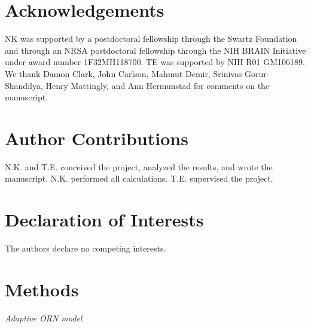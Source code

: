 \documentclass[10pt,prl,aps,showpacs,twocolumn,unsortedaddress,showkeys,linenumbers]{revtex4-1}
\begin{document}



\section*{Acknowledgements}

NK was supported by a postdoctoral fellowship through the Swartz Foundation and through an NRSA postdoctoral fellowship through the NIH BRAIN Initiative under award number 1F32MH118700. TE was supported by NIH R01 GM106189. We thank Damon  Clark, John Carlson, Mahmut Demir, Srinivas Gorur-Shandilya, Henry Mattingly, and Ann Hermunstad for comments on the manuscript. 

\section*{Author Contributions}
N.K. and T.E. conceived the project, analyzed the results, and wrote the manuscript. N.K. performed all calculations. T.E. supervised the project.

\section*{Declaration of Interests}
The authors declare no competing interests.








\section*{Methods}



\textit{Adaptive ORN model} \\
\end{document}
